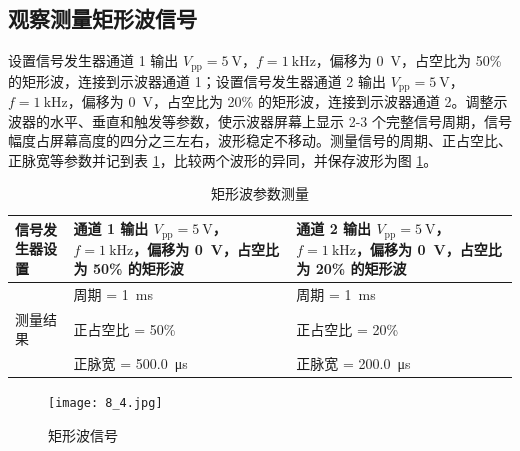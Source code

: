 \documentclass[a4paper,utf8]{article}
\begin{document}
\subsection{观察测量矩形波信号\label{sss:juxingbo}}
设置信号发生器通道 1 输出 $V_\text{pp}=\SI{5}{\V}$，$f=\SI{1}{\kilo\Hz}$，偏移为 \SI{0}{\V}，占空比为 50\% 的矩形波，连接到示波器通道 1；设置信号发生器通道 2 输出 $V_\text{pp}=\SI{5}{\V}$，$f=\SI{1}{\kilo\Hz}$，偏移为 \SI{0}{\V}，占空比为 20\% 的矩形波，连接到示波器通道 2。调整示波器的水平、垂直和触发等参数，使示波器屏幕上显示 2-3 个完整信号周期，信号幅度占屏幕高度的四分之三左右，波形稳定不移动。测量信号的周期、正占空比、正脉宽等参数并记到表 \ref{tab:8.3}，比较两个波形的异同，并保存波形为图 \ref{fig:8.4}。
\begin{table}[!ht]
    \caption{矩形波参数测量\label{tab:8.3}}
    \begin{tabularx}{\textwidth}{|p{5.1em}|X|X|}\hline
        信号发生器设置 & 通道 1 输出 $V_\text{pp}=\SI{5}{\V}$，$f=\SI{1}{\kilo\Hz}$，偏移为 \SI{0}{\V}，占空比为 50\% 的矩形波 & 通道 2 输出 $V_\text{pp}=\SI{5}{\V}$，$f=\SI{1}{\kilo\Hz}$，偏移为 \SI{0}{\V}，占空比为 20\% 的矩形波 \\ \hline
        & 周期 = \SI{1}{\ms} & 周期 = \SI{1}{\ms} \\
        测量结果 & 正占空比 = 50\% & 正占空比 = 20\% \\
        & 正脉宽 = \SI{500.0}{\us} & 正脉宽 = \SI{200.0}{\us} \\ \hline
    \end{tabularx}
\end{table}
\begin{figure}[!ht]
    \texttt{[image: 8\_4.jpg]}
    \caption{矩形波信号\label{fig:8.4}}
\end{figure}
\end{document}
